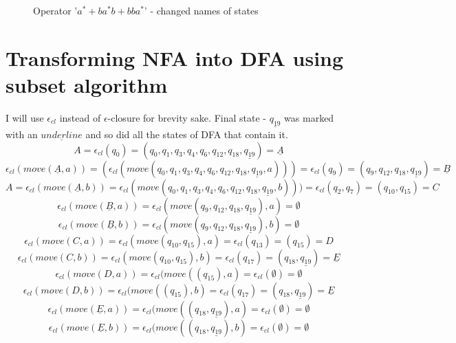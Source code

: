 \documentclass{report}[pt12]
\begin{document}
\begin{figure}[!htb]
\caption{Operator '$a^*+ba^*b + bba^*$' - changed names of states} \label{fig:finalBetter}
\end{figure}

\section{Transforming NFA into DFA using subset algorithm}
I will use $\epsilon_{cl}$ instead of $\epsilon$-closure for brevity sake.
Final state - $\underline{q_{19}}$ was marked with an $\underline{underline}$ and so did all the states of DFA that contain it.
\[ A = \epsilon_{cl}(q_0) = (q_0, q_1, q_3, q_4, q_6, q_{12}, q_{18}, \underline{q_{19}}) = \underline{A} \]
\[ \epsilon_{cl}(move(\underline{A}, a)) = (\epsilon_{cl}(move(q_0, q_1, q_3, q_4, q_6, q_{12}, q_{18}, \underline{q_{19}}, a))) = \epsilon_{cl}(q_9) = (q_9, q_{12}, q_{18}, \underline{q_{19}}) = \underline{B}  \]
\[ A = \epsilon_{cl}(move(\underline{A}, b)) = \epsilon_{cl}(move(q_0, q_1, q_3, q_4, q_6, q_{12}, q_{18}, \underline{q_{19}}, b))) = \epsilon_{cl}(q_2, q_7) = (q_{10}, q_{15}) = C \]
\[ \epsilon_{cl}(move(\underline{B}, a)) = \epsilon_{cl}(move(q_9, q_{12}, q_{18}, \underline{q_{19}}), a) = \emptyset \]
\[ \epsilon_{cl}(move(\underline{B}, b)) = \epsilon_{cl}(move(q_9, q_{12}, q_{18}, \underline{q_{19}}), b) = \emptyset \]
\[ \epsilon_{cl}(move(C, a)) = \epsilon_{cl}(move(q_{10}, q_{15}), a) = \epsilon_{cl}(q_{13}) = (q_{15}) = D \]
\[ \epsilon_{cl}(move(C, b)) = \epsilon_{cl}(move(q_{10}, q_{15}), b) = \epsilon_{cl}(q_{17}) = (q_{18}, \underline{q_{19}}) = \underline{E}  \]
\[ \epsilon_{cl}(move(D, a)) = \epsilon_{cl}(move((q_{15}), a) = \epsilon_{cl}(\emptyset) = \emptyset \]
\[ \epsilon_{cl}(move(D, b)) = \epsilon_{cl}(move((q_{15}), b) = \epsilon_{cl}(q_{17}) = (q_{18}, \underline{q_{19}}) = \underline{E} \]
\[ \epsilon_{cl}(move(\underline{E}, a)) = \epsilon_{cl}(move((q_{18}, \underline{q_{19}}), a) = \epsilon_{cl}(\emptyset) = \emptyset \]
\[ \epsilon_{cl}(move(\underline{E}, b)) = \epsilon_{cl}(move((q_{18}, \underline{q_{19}}), b) = \epsilon_{cl}(\emptyset) = \emptyset \]
\end{document}
